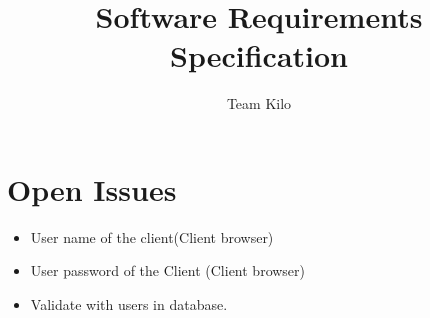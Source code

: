 \documentclass[hidelinks,a4paper,12pt]{article}
\begin{document}
	\section{Open Issues}
	\begin{itemize}
		\item User name of the client(Client browser)
		\item User password of the Client (Client browser)
		\item Validate with users in database. 
	\end{itemize}
	
	
	
	
	
	
	
	
	\author{Team Kilo}
	\title{ Software Requirements Specification}
		\setlength{\parskip}{6pt}
		
\end{document}
